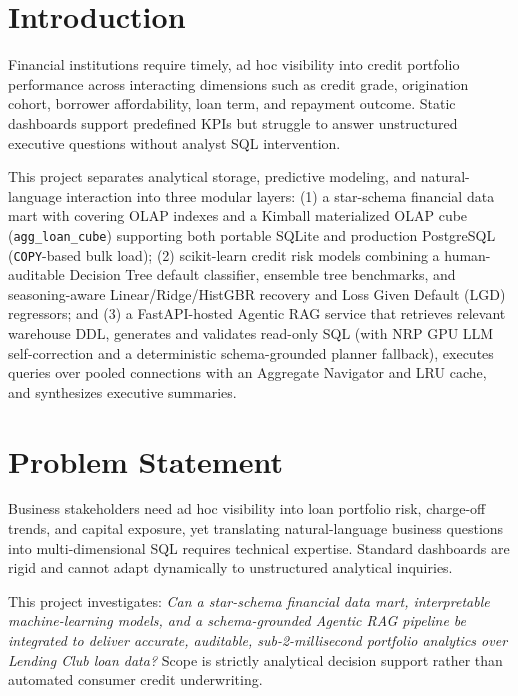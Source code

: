 \documentclass[conference]{IEEEtran}
\begin{document}
\section{Introduction}
Financial institutions require timely, ad hoc visibility into credit portfolio performance across interacting dimensions such as credit grade, origination cohort, borrower affordability, loan term, and repayment outcome. Static dashboards support predefined KPIs but struggle to answer unstructured executive questions without analyst SQL intervention.

This project separates analytical storage, predictive modeling, and natural-language interaction into three modular layers: (1) a star-schema financial data mart with covering OLAP indexes and a Kimball materialized OLAP cube (\texttt{agg\_loan\_cube}) supporting both portable SQLite and production PostgreSQL (\texttt{COPY}-based bulk load); (2) scikit-learn credit risk models combining a human-auditable Decision Tree default classifier, ensemble tree benchmarks, and seasoning-aware Linear/Ridge/HistGBR recovery and Loss Given Default (LGD) regressors; and (3) a FastAPI-hosted Agentic RAG service that retrieves relevant warehouse DDL, generates and validates read-only SQL (with NRP GPU LLM self-correction and a deterministic schema-grounded planner fallback), executes queries over pooled connections with an Aggregate Navigator and LRU cache, and synthesizes executive summaries.

\section{Problem Statement}
Business stakeholders need ad hoc visibility into loan portfolio risk, charge-off trends, and capital exposure, yet translating natural-language business questions into multi-dimensional SQL requires technical expertise. Standard dashboards are rigid and cannot adapt dynamically to unstructured analytical inquiries.

This project investigates: \emph{Can a star-schema financial data mart, interpretable machine-learning models, and a schema-grounded Agentic RAG pipeline be integrated to deliver accurate, auditable, sub-2-millisecond portfolio analytics over Lending Club loan data?} Scope is strictly analytical decision support rather than automated consumer credit underwriting.
\end{document}
